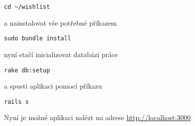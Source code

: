 \begin{lstlisting}
cd ~/wishlist
\end{lstlisting}

a nainstalovat vše potřebné příkazem

\begin{lstlisting}
sudo bundle install
\end{lstlisting}

nyní stačí inicializovat databázi práce

\begin{lstlisting}
rake db:setup
\end{lstlisting}

a spusti aplikaci pomocí příkazu 

\begin{lstlisting}
rails s
\end{lstlisting}

Nyní je možné aplikaci nalézt na adrese \url{http://localhost:3000}

